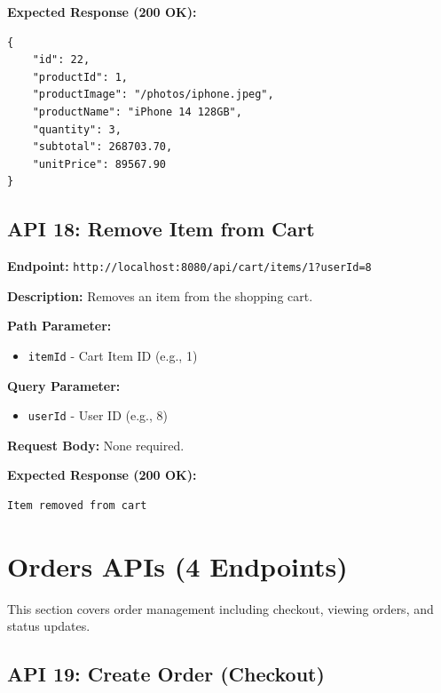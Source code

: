 \documentclass[12pt, a4paper]{article}
\begin{document}
\textbf{Expected Response (200 OK):}
\begin{lstlisting}
{
    "id": 22,
    "productId": 1,
    "productImage": "/photos/iphone.jpeg",
    "productName": "iPhone 14 128GB",
    "quantity": 3,
    "subtotal": 268703.70,
    "unitPrice": 89567.90
}
\end{lstlisting}

\vspace{0.5cm}

\subsection{API 18: Remove Item from Cart}

\begin{tcolorbox}[colback=deletecolor!10, colframe=deletecolor, title=DELETE]
\textbf{Endpoint:} \texttt{http://localhost:8080/api/cart/items/1?userId=8}
\end{tcolorbox}

\textbf{Description:} Removes an item from the shopping cart.

\textbf{Path Parameter:}
\begin{itemize}
    \item \texttt{itemId} - Cart Item ID (e.g., 1)
\end{itemize}

\textbf{Query Parameter:}
\begin{itemize}
    \item \texttt{userId} - User ID (e.g., 8)
\end{itemize}

\textbf{Request Body:} None required.

\textbf{Expected Response (200 OK):}
\begin{lstlisting}
Item removed from cart
\end{lstlisting}

\newpage

\section{Orders APIs (4 Endpoints)}

This section covers order management including checkout, viewing orders, and status updates.

\subsection{API 19: Create Order (Checkout)}
\end{document}
